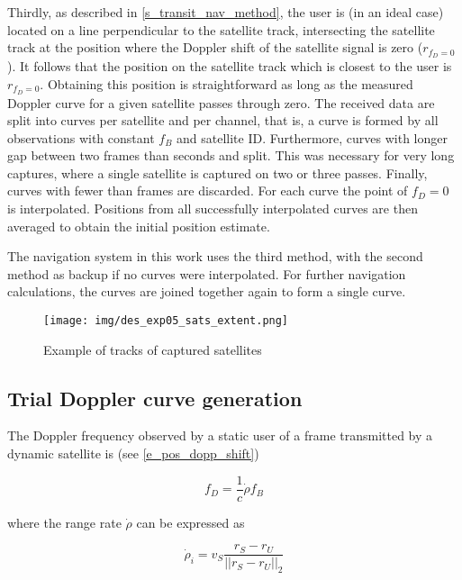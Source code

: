Thirdly, as described in \autoref{s_transit_nav_method}, the user is (in an ideal case) located on a line perpendicular to the satellite track, intersecting the satellite track at the position where the Doppler shift of the satellite signal is zero ($r_{f_D = 0}$). It follows that the position on the satellite track which is closest to the user is $r_{f_D = 0}$. Obtaining this position is straightforward as long as the measured Doppler curve for a given satellite passes through zero. The received data are split into curves per satellite and per channel, that is, a curve is formed by all observations with constant $f_B$ and satellite ID. Furthermore, curves with longer gap between two frames than  seconds and split. This was necessary for very long captures, where a single satellite is captured on two or three passes. Finally, curves with fewer than  frames are discarded. For each curve the point of $f_D = 0$ is interpolated. Positions from all successfully interpolated curves are then averaged to obtain the initial position estimate.

The navigation system in this work uses the third method, with the second method as backup if no curves were interpolated. %
For further navigation calculations, the curves are joined together again to form a single curve.


\begin{figure}
    \centering
    \texttt{[image: img/des\_exp05\_sats\_extent.png]}
    \caption{Example of tracks of captured satellites}
    \label{f_des_exp05_sats_extent}
\end{figure}


\subsection{Trial Doppler curve generation}
The Doppler frequency observed by a static user of a frame transmitted by a dynamic satellite  is (see \autoref{e_pos_dopp_shift})

\begin{equation}
    \label{e_des_dopp_shift}
    f_D = \frac{1}{c}\dot\rho f_B
\end{equation}

where the range rate $\dot\rho$ can be expressed as

\begin{equation}
    \label{e_des_range_rate}
    \dot\rho_i = v_S \frac{r_S - r_U}{||r_S - r_U||_2}
\end{equation}

